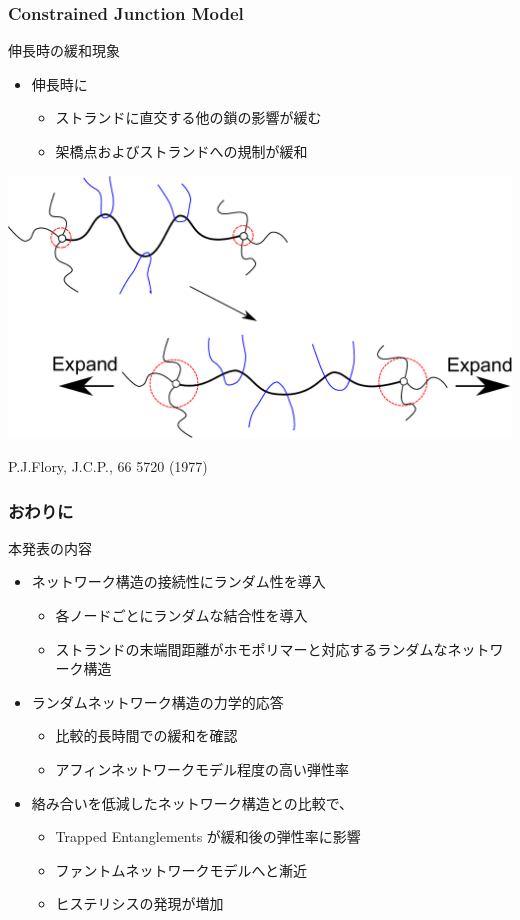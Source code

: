 \documentclass[12pt, dvipdfmx]{beamer}
\begin{document}
\begin{frame}
    \frametitle{Constrained Junction Model}
	\begin{exampleblock}{伸長時の緩和現象}
		\begin{itemize}
			\item 伸長時に
			\begin{itemize}
				\item ストランドに直交する他の鎖の影響が緩む
				\item 架橋点およびストランドへの規制が緩和
			\end{itemize}
		\end{itemize}
		\begin{center}
			\includegraphics[width=.7\textwidth]{Constrained_Juntion.pdf}

			P.J.Flory, J.C.P., 66 5720 (1977)
		\end{center}
	\end{exampleblock}
\end{frame}		

\begin{frame}
	\frametitle{おわりに}
		\begin{block}{本発表の内容}
			\begin{itemize}
			\item ネットワーク構造の接続性にランダム性を導入
				\begin{itemize}
					\item 各ノードごとにランダムな結合性を導入
					\item ストランドの末端間距離がホモポリマーと対応するランダムなネットワーク構造
				\end{itemize}
			\item ランダムネットワーク構造の力学的応答
				\begin{itemize}
					\item 比較的長時間での緩和を確認
					\item アフィンネットワークモデル程度の高い弾性率
				\end{itemize}
			\item 絡み合いを低減したネットワーク構造との比較で、
				\begin{itemize}
					\item Trapped Entanglements が緩和後の弾性率に影響 
					\item ファントムネットワークモデルへと漸近
					\item ヒステリシスの発現が増加
				\end{itemize}
			\end{itemize}
		\end{block}
\end{frame}
\end{document}
